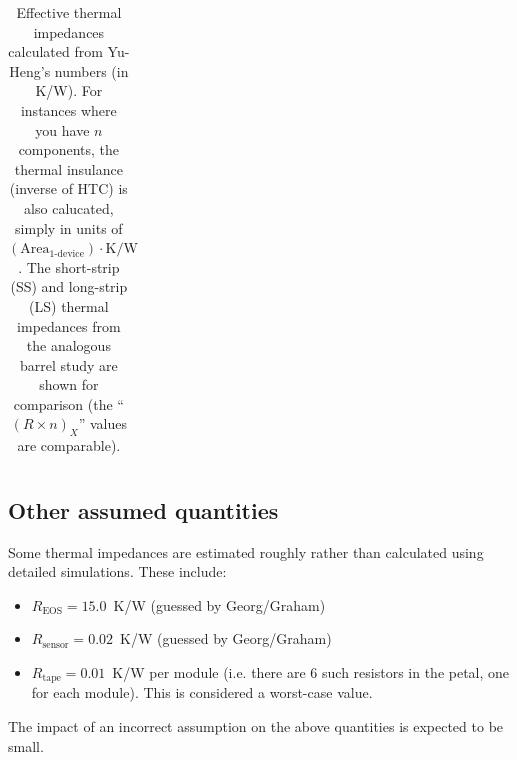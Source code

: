 \begin{table}[h]
\begin{center}
{\begin{tabular}{|l|cc|c|c|c|c|c|c|}
\hline \end{tabular}
} %
\end{center}
\caption{Effective thermal impedances calculated from Yu-Heng's numbers (in K/W).
For instances where you have $n$ components, the thermal insulance (inverse of HTC) is also calucated, simply
in units of {${(\text{Area}_\text{1-device})\cdot\text{K/W}}$}.
The short-strip (SS) and long-strip (LS) thermal impedances from the analogous barrel study are shown
for comparison (the ``$(R\times n)_X$'' values are comparable).
}
\label{tab:thermal_impedances}
\end{table}
\let\arraystretch\arraystretcha

\subsection{Other assumed quantities}

Some thermal impedances are estimated roughly rather than calculated using detailed simulations.
These include:
%
\begin{itemize}
\item $R_\text{EOS}=15.0$~K/W (guessed by Georg/Graham)
\item $R_\text{sensor}=0.02$~K/W (guessed by Georg/Graham)
\item $R_\text{tape}=0.01$~K/W per module (i.e. there are 6 such resistors in the petal, one
for each module). This is considered a worst-case value.
\end{itemize}
%
The impact of an incorrect assumption on the above quantities is expected to be small.

